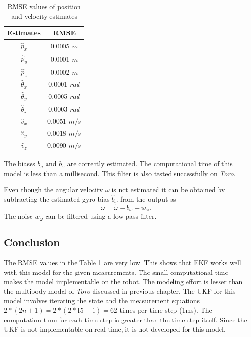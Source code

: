 \begin{table}
    \centering
    \begin{tabular}{|c|c|}
    \hline
    Estimates &RMSE \\ \hline
    $\hat p_x$ &0.0005 $m$\\
    $\hat p_y$ &0.0001 $m$\\
    $\hat p_z$ &0.0002 $m$\\
    $\hat\theta_x$ &0.0001 $rad$\\
    $\hat\theta_y$ &0.0005 $rad$\\
    $\hat\theta_z$ &0.0003 $rad$\\ 
    $\hat v_x$ &0.0051 $m/s$\\
    $\hat v_y$ &0.0018 $m/s$\\
    $\hat v_z$ &0.0090 $m/s$\\\hline
    \end{tabular} \hspace{1cm}
    \caption{RMSE values of position and velocity estimates}
    \label{tab:simp_rmse}
\end{table}

The biases $b_a$ and $b_\omega$ are correctly estimated. The computational time of this model is less than a millisecond. This filter is also tested successfully on \emph{Toro}. 

Even though the angular velocity $\omega$ is not estimated it can be obtained by subtracting the estimated gyro bias $\hat b_\omega$ from the output as
$$ \omega = \tilde{\omega} - b_\omega - w_\omega.$$ 
The noise $w_\omega$ can be filtered using a low pass filter.

\subsection{Conclusion}
The RMSE values in the Table \ref{tab:simp_rmse} are very low. This shows that EKF works well with this model for the given measurements. The small computational time makes the model implementable on the robot. The modeling effort is lesser than the multibody model of \emph{Toro} discussed in previous chapter. The UKF for this model involves iterating the state and the measurement equations $2*(2n+1)=2*(2*15+1)=62$ times per time step (1ms). The computation time for each time step is greater than the time step itself. Since the UKF is not implementable on real time, it is not developed for this model.